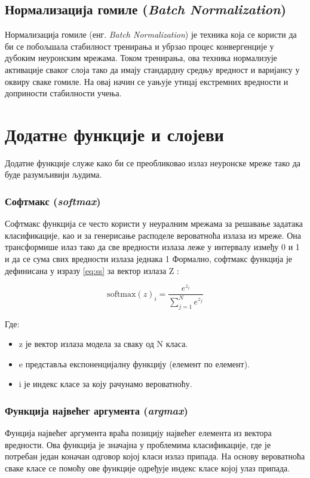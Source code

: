 \documentclass[a4paper, 12pt, master, utf8]{etf}
\begin{document}
\subsection{Нормализација гомиле (\textit{Batch Normalization})}

Нормализација гомиле (енг. \textit{Batch Normalization}) је техника која се користи да би се побољшала стабилност тренирања и убрзао процес конвергенције у дубоким неуронским мрежама. 
Током тренирања, ова техника нормализује активације сваког слоја тако да имају стандардну средњу вредност и варијансу у оквиру сваке гомиле.
На овај начин се уањује утицај екстремних вредности и доприности стабилности учења.


\section{Додатнe функције и слојеви}
\label{sec:26}

Додатне функције служе како би се преобликовао излаз неуронске мреже тако да буде разумљивији људима.

\subsubsection{Софтмакс (\textit{softmax})}

Софтмакс функција се често користи у неуралним мрежама за решавање задатака класификације, као и за генерисање расподеле вероватноћа излаза из мреже. 
Она трансформише илаз тако да све вредности излаза леже у интервалу између 0 и 1 и да се сума свих вредности излаза једнака 1 
Формално, софтмакс функција је дефинисана у изразу \ref{eq:ss} за вектор излаза Z :

\begin{equation}
    \label{eq:ss}
    \text{softmax}(z)_i = \frac{e^{z_i}}{\sum_{j=1}^{N} e^{z_j}}
\end{equation}

Где:

\begin{itemize}
    \item z је вектор излаза модела за сваку од N класа.
    \item e представља експоненцијалну функцију (елемент по елемент).
    \item i је индекс класе за коју рачунамо вероватноћу.
\end{itemize}


\subsubsection{Функција највећег аргумента (\textit{argmax})}
Фунција највећег аргумента враћа позицију највећег елемента из вектора вредности. Ова функција је значајна у проблемима класификације, где је потребан један коначан одговор којој класи 
излаз припада. На основу вероватноћа сваке класе се помоћу ове функције одређује индекс класе којој улаз припада.
\end{document}
